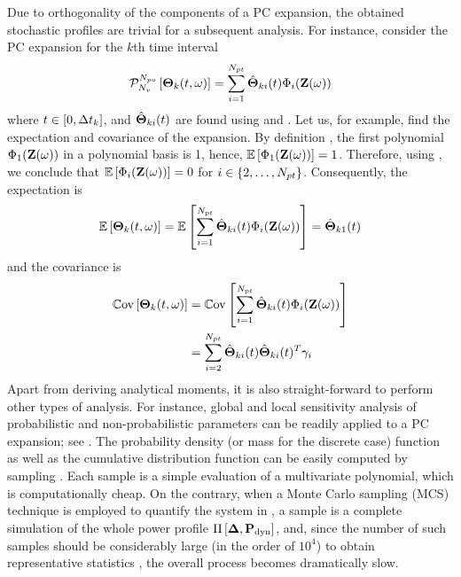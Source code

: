 Due to orthogonality of the components of a PC expansion, the obtained stochastic profiles are trivial for a subsequent analysis. For instance, consider the PC expansion for the $k$th time interval
\begin{equation} \elabel{pc-k}
  \oPC{\vars}{\pcorder}{\vTO_k(\t, \o)} = \sum_{i = 1}^{\pcterms} \pcc{\vTO}_{ki}(\t) \pcb_i(\vZ(\o))
\end{equation}
where $t \in [0, \Delta t_k]$, and $\hat{{\boldsymbol\Theta}}_{ki}(t)$ are found using  and . Let us, for example, find the expectation and covariance of the expansion. By definition \cite{xiu2002}, the first polynomial $\Phi_1(\mathbf{Z}(\omega))$ in a polynomial basis is 1, hence, $\mathbb{E}\left[\Phi_1(\mathbf{Z}(\omega))\right] = 1$. Therefore, using , we conclude that $\mathbb{E}\left[\Phi_i(\mathbf{Z}(\omega))\right] = 0$ for $i \in \{ 2, \dotsc, {N_{pt}} \}$. Consequently, the expectation is
\[
  \mathbb{E}\left[{\boldsymbol\Theta}_k(t, \omega)\right] = \mathbb{E}\left[\sum_{i = 1}^{{N_{pt}}} \hat{{\boldsymbol\Theta}}_{ki}(t) \Phi_i(\mathbf{Z}(\omega))\right] = \hat{{\boldsymbol\Theta}}_{k1}(t)
\]
and the covariance is
\begin{align*}
  \mathbb{C}\text{ov}\left[{\boldsymbol\Theta}_k(t, \omega)\right] & = \mathbb{C}\text{ov}\left[\sum_{i = 1}^{{N_{pt}}} \hat{{\boldsymbol\Theta}}_{ki}(t) \Phi_i(\mathbf{Z}(\omega))\right] \\
  & = \sum_{i = 2}^{{N_{pt}}} \hat{{\boldsymbol\Theta}}_{ki}(t) \hat{{\boldsymbol\Theta}}_{ki}(t)^T \gamma_i
\end{align*}
Apart from deriving analytical moments, it is also straight-forward to perform other types of analysis. For instance, global and local sensitivity analysis of probabilistic and non-probabilistic parameters can be readily applied to a PC expansion; see \cite{eldred2009}. The probability density (or mass for the discrete case) function as well as the cumulative distribution function can be easily computed by sampling . Each sample is a simple evaluation of a multivariate polynomial, which is computationally cheap. On the contrary, when a Monte Carlo sampling (MCS) technique is employed to quantify the system in , a sample is a complete simulation of the whole power profile $\prof{\mP_\dyn}$, and, since the number of such samples should be considerably large (in the order of $10^4$) to obtain representative statistics \cite{xiu2009}, the overall process becomes dramatically slow.

